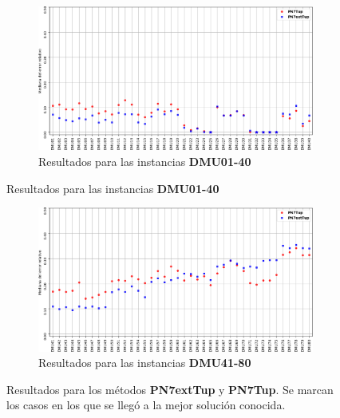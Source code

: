 \begin{figure}[hbtp]
    \begin{subfigure}{\textwidth}
        \centering
        \includegraphics[scale=.6]{Imagenes/n8vsn7err1.png}
        \caption{Resultados para las instancias \textbf{DMU01-40}}
    \end{subfigure}
\end{figure}
\begin{figure}[H]\ContinuedFloat
    \begin{subfigure}{\textwidth}
        \centering
        \includegraphics[scale=.6]{Imagenes/n8vsn7err2.png}
        \caption{Resultados para las instancias \textbf{DMU41-80}}
    \end{subfigure}
    \caption{Resultados para los métodos \textbf{PN7extTup} y \textbf{PN7Tup}. Se marcan los casos en los que se llegó a la mejor solución conocida.}
    \label{fig:errn8vsn7}
\end{figure}

